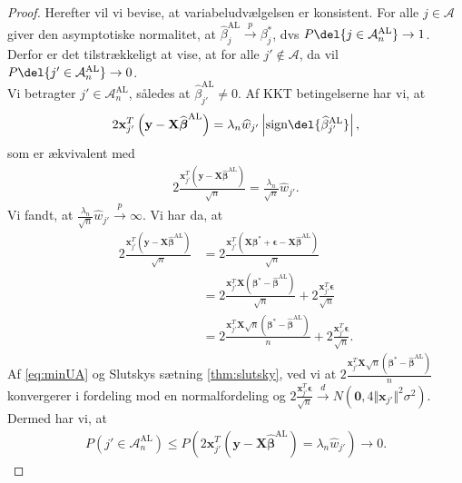 \begin{proof}
Herefter vil vi bevise, at variabeludvælgelsen er konsistent. For alle $j \in \mathcal{A}$ giver den asymptotiske normalitet, at $\widehat{\beta}_j^{\text{AL}} \overset{p}{\rightarrow}\beta_j^{*}$, dvs $P \del{j \in \mathcal{A}_n^{\text{AL}}} \rightarrow 1$. Derfor er det tilstrækkeligt at vise, at for alle $j' \notin \mathcal{A}$, da vil $P \del{j' \in \mathcal{A}_n^{\text{AL}}} \rightarrow 0$. \\
Vi betragter $j' \in \mathcal{A}_n^{\text{AL}}$, således at $\widehat{\beta}_{j'}^{\text{AL}} \neq 0$. Af KKT betingelserne har vi, at 
\begin{align*}
2 \mathbf{x}_{j'}^T  \left( \mathbf{y}-\mathbf{X}\widehat{\boldsymbol{\beta}}^{\text{AL}} \right)=\lambda_n \widehat{w}_{j'} \left\vert \text{sign} \del{\widehat{\beta}_{j'}^\text{AL}} \right\vert,
\end{align*}
som er ækvivalent med
\begin{align*}
2 \frac{\mathbf{x}_{j'}^T \left( \mathbf{y}-\mathbf{X}\widehat{\boldsymbol{\beta}}^{{\text{AL}}}\right)}{\sqrt{n}}=\frac{\lambda_n}{\sqrt{n}} \widehat{w}_{j'}.
\end{align*}
Vi fandt, at $\frac{\lambda_n}{\sqrt{n}} \widehat{w}_{j'} \overset{p}{\rightarrow} \infty$. Vi har da, at 
\begin{align*}
2 \frac{\mathbf{x}_{j'}^T \left(\mathbf{y}-\mathbf{X}\widehat{\boldsymbol{\beta}}^{{\text{AL}}} \right)}{\sqrt{n}}
 &= 2 \frac{\mathbf{x}_{j'}^T \left(\mathbf{X}\boldsymbol{\beta}^*+\boldsymbol{\epsilon}-\mathbf{X}\widehat{\boldsymbol{\beta}}^{{\text{AL}}} \right) }{\sqrt{n}} \\
&= 2 \frac{\mathbf{x}_{j'}^T \mathbf{X} \left(\boldsymbol{\beta}^*-\widehat{\boldsymbol{\beta}}^{\text{AL}} \right)}{\sqrt{n}}+2\frac{\mathbf{x}_{j'}^T \boldsymbol{\epsilon}}{\sqrt{n}} \\
&= 2 \frac{\mathbf{x}_{j'}^T \mathbf{X} \sqrt{n} \left(\boldsymbol{\beta}^*-\widehat{\boldsymbol{\beta}}^{\text{AL}}\right)}{n}+2\frac{\mathbf{x}_{j'}^T \boldsymbol{\epsilon}}{\sqrt{n}}.
\end{align*}
Af \eqref{eq:minUA} og Slutskys sætning \ref{thm:slutsky}, ved vi at $ 2 \frac{\mathbf{x}_{j'}^T \mathbf{X} \sqrt{n} \left(\boldsymbol{\beta}^*-\widehat{\boldsymbol{\beta}}^{\text{AL}}\right)}{n}$ konvergerer i fordeling mod en normalfordeling og $2\frac{\mathbf{x}_{j'}^T \boldsymbol{\epsilon}}{\sqrt{n}} \overset{d}{\rightarrow} N \left(\mathbf{0}, 4 \Vert \mathbf{x}_{j'} \Vert^2 \sigma^2 \right)$. Dermed har vi, at
\begin{align*}
P\left(j' \in \mathcal{A}_n^{\text{AL}}\right) \leq P\left(2 \mathbf{x}_{j'}^T \left(\mathbf{y}-\mathbf{X} \widehat{\boldsymbol{\beta}}^{\text{AL}}\right)=\lambda_n \widehat{w}_{j'} \right) \rightarrow 0.
\end{align*}
\end{proof}
%
